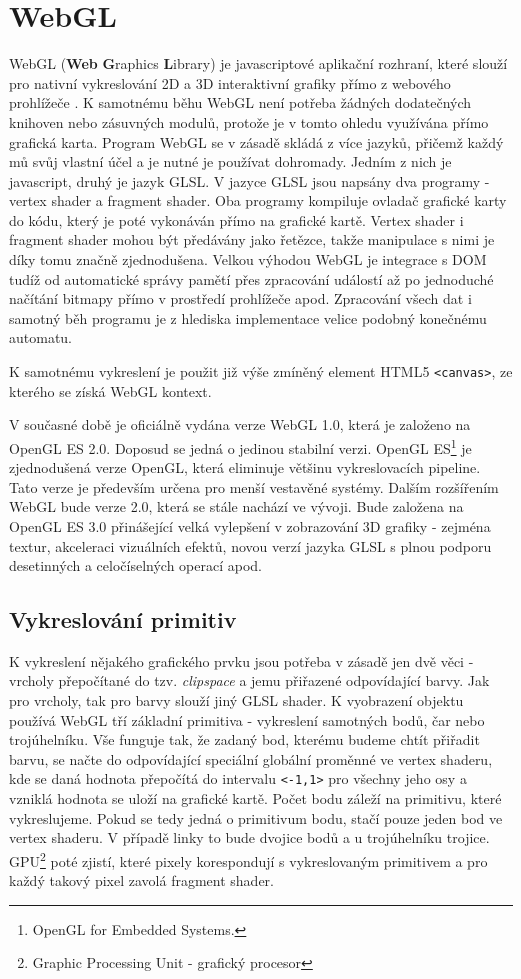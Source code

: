 \section{WebGL}
WebGL (\textbf{Web} \textbf{G}raphics \textbf{L}ibrary) je javascriptové aplikační rozhraní, které slouží pro nativní vykreslování 2D a 3D interaktivní grafiky přímo z webového prohlížeče \cite{mozilla}. K samotnému běhu WebGL není potřeba žádných dodatečných knihoven nebo zásuvných modulů, protože je v tomto ohledu využívána přímo grafická karta. Program WebGL se v zásadě skládá z více jazyků, přičemž každý mů svůj vlastní účel a je nutné je používat dohromady. Jedním z nich je javascript, druhý je jazyk GLSL. V jazyce GLSL jsou napsány dva programy - vertex shader a fragment shader. Oba programy kompiluje ovladač grafické karty do kódu, který je poté vykonáván přímo na grafické kartě. Vertex shader i fragment shader mohou být předávány jako řetězce, takže manipulace s nimi je díky tomu značně zjednodušena. Velkou výhodou WebGL je integrace s DOM tudíž od automatické správy pamětí přes zpracování událostí až po jednoduché načítání bitmapy přímo v prostředí prohlížeče apod. Zpracování všech dat i samotný běh programu je z hlediska implementace velice podobný konečnému automatu. 

K samotnému vykreslení je použit již výše zmíněný element HTML5 \texttt{<canvas>}, ze kterého se získá WebGL kontext.

V současné době je oficiálně vydána verze WebGL 1.0, která je založeno na OpenGL ES 2.0. Doposud se jedná o jedinou stabilní verzi. OpenGL ES\footnote{OpenGL for Embedded Systems.} je zjednodušená verze OpenGL, která eliminuje většinu vykreslovacích pipeline. Tato verze je především určena pro menší vestavěné systémy. Dalším rozšířením WebGL bude verze 2.0, která se stále nachází ve vývoji. Bude založena na OpenGL ES 3.0 přinášející velká vylepšení v zobrazování 3D grafiky - zejména textur, akceleraci vizuálních efektů, novou verzí jazyka GLSL s plnou podporu desetinných a celočíselných operací apod.



\subsection{Vykreslování primitiv}
K vykreslení nějakého grafického prvku jsou potřeba v zásadě jen dvě věci - vrcholy přepočítané do tzv. \textit{clipspace} a jemu přiřazené odpovídající barvy. Jak pro vrcholy, tak pro barvy slouží jiný GLSL shader. K vyobrazení objektu používá WebGL tří základní primitiva - vykreslení samotných bodů, čar nebo trojúhelníku. Vše funguje tak, že zadaný bod, kterému budeme chtít přiřadit barvu, se načte do odpovídající speciální globální proměnné ve vertex shaderu, kde se daná hodnota přepočítá do intervalu \texttt{<-1,1>} pro všechny jeho osy a vzniklá hodnota se uloží na grafické kartě. Počet bodu záleží na primitivu, které vykreslujeme. Pokud se tedy jedná o primitivum bodu, stačí pouze jeden bod ve vertex shaderu. V případě linky to bude dvojice bodů a u trojúhelníku trojice. GPU\footnote{Graphic Processing Unit - grafický procesor} poté zjistí, které pixely korespondují s vykreslovaným primitivem a pro každý takový pixel zavolá fragment shader. 


